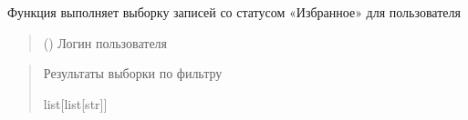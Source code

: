 \documentclass[letterpaper,10pt,russian]{sphinxmanual}
\begin{document}
\begin{fulllineitems}
\begin{description}
\begin{sphinxVerbatim}[commandchars=\\\{\}]
\end{sphinxVerbatim}

\end{description}

\begin{fulllineitems}
\label{\detokenize{database.sqlite3_interface.views:database.sqlite3_interface.views.view_favorites.ViewFavorites.select_for_user}}
\pysigstartsignatures
{}
\pysigstopsignatures
\sphinxAtStartPar
Функция выполняет выборку записей со статусом «Избранное» для пользователя
\begin{quote}\begin{description}
\sphinxAtStartPar
{} () \textendash{} Логин пользователя

\end{description}\end{quote}
\begin{description}
\begin{sphinxVerbatim}[commandchars=\\\{\}]
\end{sphinxVerbatim}

\end{description}
\begin{quote}\begin{description}
\sphinxAtStartPar
Результаты выборки по фильтру

\sphinxAtStartPar
list{[}list{[}str{]}{]}

\end{description}\end{quote}

\end{fulllineitems}


\end{fulllineitems}
\end{document}
